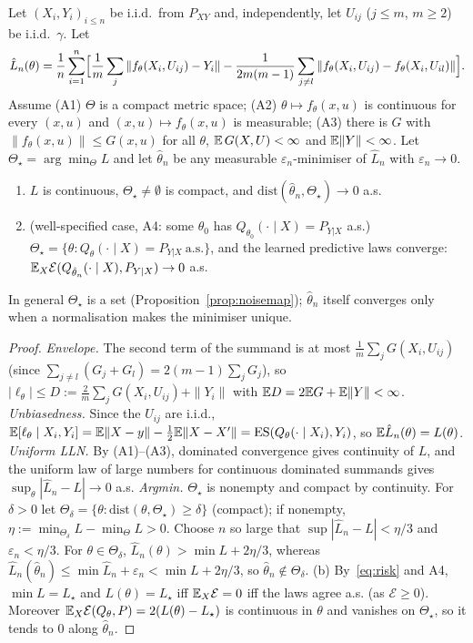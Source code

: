 \begin{theorem}\label{thm:consistency}
Let $(X_i,Y_i)_{i\le n}$ be i.i.d.\ from $P_{XY}$ and, independently, let $U_{ij}$ ($j\le m$, $m\ge2$) be i.i.d.\ $\gamma$.
Let
\[
\hat L_n(\theta)=\frac1n\sum_{i=1}^n\Bigl[\frac1m\sum_{j}\|f_\theta(X_i,U_{ij})-Y_i\|-\frac1{2m(m-1)}\sum_{j\ne l}\|f_\theta(X_i,U_{ij})-f_\theta(X_i,U_{il})\|\Bigr].
\]
Assume (A1) $\Theta$ is a compact metric space; (A2) $\theta\mapsto f_\theta(x,u)$ is continuous for every $(x,u)$ and $(x,u)\mapsto f_\theta(x,u)$ is measurable; (A3) there is $G$ with $\|f_\theta(x,u)\|\le G(x,u)$ for all $\theta$, $\mathbb{E}\,G(X,U)<\infty$ and $\mathbb{E}\|Y\|<\infty$.
Let $\Theta_\star=\arg\min_\Theta L$ and let $\hat\theta_n$ be any measurable $\varepsilon_n$-minimiser of $\hat L_n$ with $\varepsilon_n\to0$.
\begin{enumerate}
\item[(a)] $L$ is continuous, $\Theta_\star\ne\emptyset$ is compact, and $\mathrm{dist}(\hat\theta_n,\Theta_\star)\to0$ a.s.
\item[(b)] (well-specified case, A4: some $\theta_0$ has $Q_{\theta_0}(\cdot\mid X)=P_{Y|X}$ a.s.) $\Theta_\star=\{\theta:Q_\theta(\cdot\mid X)=P_{Y|X}\ \text{a.s.}\}$, and the learned predictive laws converge: $\mathbb{E}_X\mathcal E(Q_{\hat\theta_n}(\cdot\mid X),P_{Y|X})\to0$ a.s.
\end{enumerate}
In general $\Theta_\star$ is a set (Proposition~\ref{prop:noisemap}); $\hat\theta_n$ itself converges only when a normalisation makes the minimiser unique.
\end{theorem}
\begin{proof}
\emph{Envelope.} The second term of the summand is at most $\frac1m\sum_jG(X_i,U_{ij})$ (since $\sum_{j\ne l}(G_j+G_l)=2(m-1)\sum_jG_j$), so $|\ell_\theta|\le D:=\frac2m\sum_jG(X_i,U_{ij})+\|Y_i\|$ with $\mathbb{E} D=2\mathbb{E} G+\mathbb{E}\|Y\|<\infty$.
\emph{Unbiasedness.} Since the $U_{ij}$ are i.i.d., $\mathbb{E}[\ell_\theta\mid X_i,Y_i]=\mathbb{E}\|X-y\|-\tfrac12\mathbb{E}\|X-X'\|=\operatorname{ES}(Q_\theta(\cdot\mid X_i),Y_i)$, so $\mathbb{E}\hat L_n(\theta)=L(\theta)$.
\emph{Uniform LLN.} By (A1)--(A3), dominated convergence gives continuity of $L$, and the uniform law of large numbers for continuous dominated summands \cite{jennrich1969,newey1994} gives $\sup_\theta|\hat L_n-L|\to0$ a.s.
\emph{Argmin.} $\Theta_\star$ is nonempty and compact by continuity. For $\delta>0$ let $\Theta_\delta=\{\theta:\mathrm{dist}(\theta,\Theta_\star)\ge\delta\}$ (compact); if nonempty, $\eta:=\min_{\Theta_\delta}L-\min_\Theta L>0$. Choose $n$ so large that $\sup|\hat L_n-L|<\eta/3$ and $\varepsilon_n<\eta/3$. For $\theta\in\Theta_\delta$, $\hat L_n(\theta)>\min L+2\eta/3$, whereas $\hat L_n(\hat\theta_n)\le\min\hat L_n+\varepsilon_n<\min L+2\eta/3$, so $\hat\theta_n\notin\Theta_\delta$.
(b) By~\eqref{eq:risk} and A4, $\min L=L_\star$ and $L(\theta)=L_\star$ iff $\mathbb{E}_X\mathcal E=0$ iff the laws agree a.s. (as $\mathcal E\ge0$). Moreover $\mathbb{E}_X\mathcal E(Q_\theta,P)=2(L(\theta)-L_\star)$ is continuous in $\theta$ and vanishes on $\Theta_\star$, so it tends to $0$ along $\hat\theta_n$.
\end{proof}

